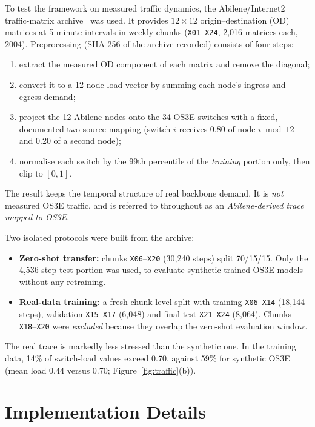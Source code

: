 To test the framework on measured traffic dynamics, the Abilene/Internet2 traffic-matrix archive~\cite{zhang2004abilene,zhang2003tm} was used. It provides $12\times12$ origin--destination (OD) matrices at 5-minute intervals in weekly chunks (\texttt{X01}--\texttt{X24}, 2,016 matrices each, 2004). Preprocessing (SHA-256 of the archive recorded) consists of four steps:
\begin{enumerate}[leftmargin=*]
  \item extract the measured OD component of each matrix and remove the diagonal;
  \item convert it to a 12-node load vector by summing each node's ingress and egress demand;
  \item project the 12 Abilene nodes onto the 34 OS3E switches with a fixed, documented two-source mapping (switch $i$ receives 0.80 of node $i \bmod 12$ and 0.20 of a second node);
  \item normalise each switch by the 99th percentile of the \emph{training} portion only, then clip to $[0,1]$.
\end{enumerate}
The result keeps the temporal structure of real backbone demand. It is \emph{not} measured OS3E traffic, and is referred to throughout as an \emph{Abilene-derived trace mapped to OS3E}.

Two isolated protocols were built from the archive:
\begin{itemize}[leftmargin=*]
  \item \textbf{Zero-shot transfer:} chunks \texttt{X06}--\texttt{X20} (30,240 steps) split 70/15/15. Only the 4,536-step test portion was used, to evaluate synthetic-trained OS3E models without any retraining.
  \item \textbf{Real-data training:} a fresh chunk-level split with training \texttt{X06}--\texttt{X14} (18,144 steps), validation \texttt{X15}--\texttt{X17} (6,048) and final test \texttt{X21}--\texttt{X24} (8,064). Chunks \texttt{X18}--\texttt{X20} were \emph{excluded} because they overlap the zero-shot evaluation window.
\end{itemize}
The real trace is markedly less stressed than the synthetic one. In the training data, 14\% of switch-load values exceed 0.70, against 59\% for synthetic OS3E (mean load 0.44 versus 0.70; Figure~\ref{fig:traffic}(b)).

\section{Implementation Details}
\label{sec:impl}

